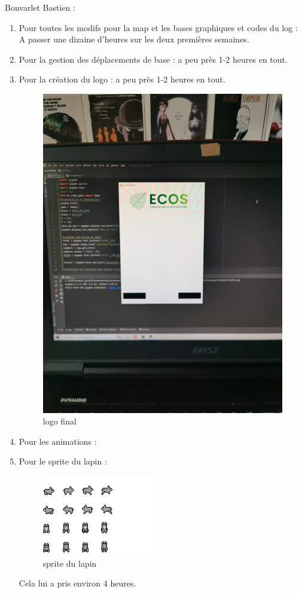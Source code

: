 \documentclass[a4paper, 11pt]{article}
\begin{document}
Bonvarlet Bastien :\\
\begin{enumerate}
\item Pour toutes les modifs pour la map et les bases graphiques et codes du log : A passer une dizaine d'heures sur les deux premières semaines.\\
\item Pour la gestion des déplacements de base : a peu près 1-2 heures en tout.\\
\item Pour la création du logo : a peu près 1-2 heures en tout.\\
\begin{figure}[ht!]
 \centering
 \includegraphics[width=0.5\linewidth]{images/creation_logo.jpg}
 \caption{logo final}
 \label{fig::example::one}
\end{figure}
\item Pour les animations : \\
\item Pour le sprite du lapin :\\
\begin{figure}[ht!]
 \centering
 \includegraphics[width=0.75\linewidth]{images/rabbit.png}
 \caption{sprite du lapin}
 \label{fig::example::one}
\end{figure}
Cela lui a pris environ 4 heures.
\end{enumerate}
\end{document}
